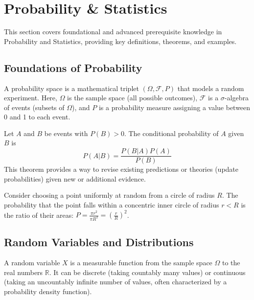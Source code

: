 \chapter{Probability \& Statistics}

This section covers foundational and advanced prerequisite knowledge in Probability and Statistics, providing key definitions, theorems, and examples.

\section{Foundations of Probability}

\begin{definition}
A probability space is a mathematical triplet $(\Omega, \mathcal{F}, P)$ that models a random experiment. Here, $\Omega$ is the sample space (all possible outcomes), $\mathcal{F}$ is a $\sigma$-algebra of events (subsets of $\Omega$), and $P$ is a probability measure assigning a value between 0 and 1 to each event.
\end{definition}

\begin{theorem}
Let $A$ and $B$ be events with $P(B) > 0$. The conditional probability of $A$ given $B$ is
\[ P(A|B) = \frac{P(B|A)P(A)}{P(B)} \]
This theorem provides a way to revise existing predictions or theories (update probabilities) given new or additional evidence.
\end{theorem}

\begin{example}
Consider choosing a point uniformly at random from a circle of radius $R$. The probability that the point falls within a concentric inner circle of radius $r < R$ is the ratio of their areas: $P = \frac{\pi r^2}{\pi R^2} = \left(\frac{r}{R}\right)^2$.
\end{example}

\section{Random Variables and Distributions}

\begin{definition}
A random variable $X$ is a measurable function from the sample space $\Omega$ to the real numbers $\mathbb{R}$. It can be discrete (taking countably many values) or continuous (taking an uncountably infinite number of values, often characterized by a probability density function).
\end{definition}

